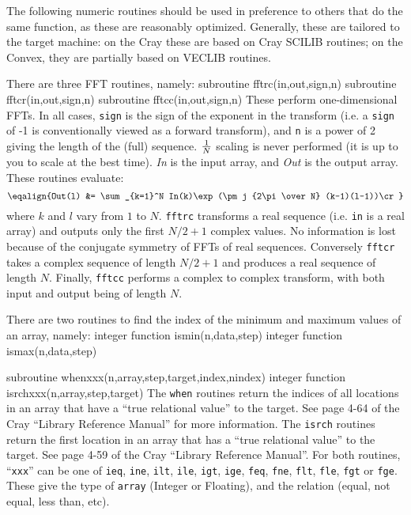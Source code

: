 %
%

The following numeric routines should be used in preference to others that do
the same function, as these are reasonably optimized.  Generally, these are
tailored to the target machine:  on the Cray these are based on Cray SCILIB
routines; on the Convex, they are partially based on VECLIB routines.


There are three FFT routines, namely:
{\ninepoint\begintt
      subroutine fftrc(in,out,sign,n)
      subroutine fftcr(in,out,sign,n)
      subroutine fftcc(in,out,sign,n)
\endtt}
These perform one-dimensional FFTs. In all cases, {\tt sign} is the sign
of the exponent in the transform (i.e. a {\tt sign} of -1 is conventionally
viewed as a forward transform), and {\tt n} is a power of 2 giving the
length of the (full) sequence. ${1\over N}$ scaling is never performed
(it is up to you to scale at the best time). {\it In} is the input
array, and {\it Out} is the output array. These routines
evaluate:
$$\eqalign{Out(l) &= \sum_{k=1}^N In(k)\exp(\pm j {2\pi\over N} (k-1)(l-1))\cr}$$
where $k$ and $l$ vary from $1$ to $N$.
{\tt fftrc} transforms a real
sequence (i.e. {\tt in} is a real array) and outputs only the first $N/2 + 1$
complex values. No information is lost because of the conjugate
symmetry of FFTs of real sequences. Conversely {\tt fftcr} takes a
complex sequence of length $N/2+1$ and produces a real sequence of length $N$.
Finally, {\tt fftcc} performs a complex to complex transform, with
both input and output being of length $N$.


There are two routines to find the index of the minimum and maximum values
of an array, namely:
{\ninepoint\begintt
      integer function ismin(n,data,step)
      integer function ismax(n,data,step)
\endtt}


{\ninepoint\begintt
      subroutine whenxxx(n,array,step,target,index,nindex)
      integer function isrchxxx(n,array,step,target)
\endtt}
The {\tt when} routines return the indices of all locations in an array that
have a ``true relational value'' to the target. See page 4-64 of the
Cray ``Library Reference Manual'' for more information. The {\tt isrch}
routines return the first location in an array that has a ``true
relational value'' to the target. See page 4-59 of the Cray ``Library
Reference Manual''. For both routines, ``{\tt xxx}'' can be one of
{\tt ieq}, {\tt ine}, {\tt ilt}, {\tt ile}, {\tt igt}, {\tt ige}, {\tt feq},
{\tt fne}, {\tt flt}, {\tt fle}, {\tt fgt} or {\tt fge}.
These give the type of {\tt array} (Integer or Floating), and the relation
(equal, not equal, less than, etc).

